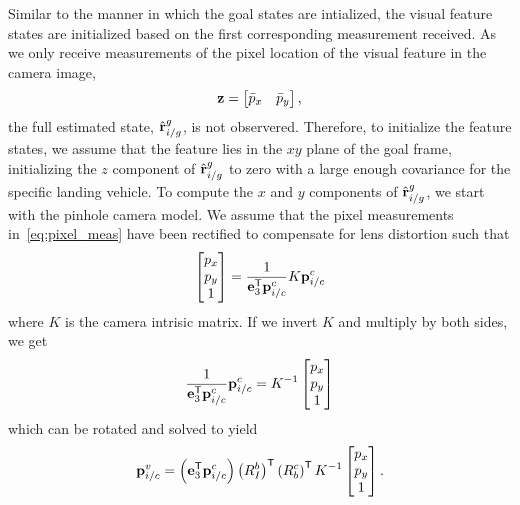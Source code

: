 Similar to the manner in which the goal states are intialized,
the visual feature states are initialized based on the first corresponding measurement received.
As we only receive measurements of the pixel
location of the visual feature in the camera image,
\begin{equation}
  \boldsymbol{\mathrm{z}} = \begin{bmatrix} \bar{p}_x & \bar{p}_y \end{bmatrix}
  \label{eq:pixel_meas},
\end{equation}
the full estimated state, $\hat{\boldsymbol{\mathrm{r}}}_{i/g}^g$, is not observered.
Therefore, to initialize
the feature states, we assume that the feature lies in the $xy$ plane of the
goal frame, initializing the $z$ component of $\hat{\boldsymbol{\mathrm{r}}}_{i/g}^g$ to zero with a
large enough covariance for the specific landing vehicle. To compute the
$x$ and $y$ components of $\hat{\boldsymbol{\mathrm{r}}}_{i/g}^g$, we start with the pinhole camera
model. We assume that the pixel measurements in~\eqref{eq:pixel_meas} have been
rectified to compensate for lens distortion such that
\begin{equation}
  \begin{bmatrix}
    p_x \\ p_y \\ 1
  \end{bmatrix} = \frac{1}{\boldsymbol{\mathrm{e}}_3^{\mathsf{T}} \boldsymbol{\mathrm{p}}_{i/c}^c} K \boldsymbol{\mathrm{p}}_{i/c}^c \\
\end{equation}
where $K$ is the camera intrisic matrix. If we invert $K$ and multiply by both
sides, we get
\begin{equation}
 \frac{1}{\boldsymbol{\mathrm{e}}_3^{\mathsf{T}} \boldsymbol{\mathrm{p}}_{i/c}^c} \boldsymbol{\mathrm{p}}_{i/c}^c
  =
  K^{-1} \begin{bmatrix}
    p_x \\ p_y \\ 1
  \end{bmatrix}
\end{equation}
which can be rotated and solved to yield
\begin{equation}
 \boldsymbol{\mathrm{p}}_{i/c}^v
  =
  \left( \boldsymbol{\mathrm{e}}_3^{\mathsf{T}} \boldsymbol{\mathrm{p}}_{i/c}^c \right) \left( R_I^b
  \right)^{\mathsf{T}} \left( R_b^c \right)^{\mathsf{T}} K^{-1} \begin{bmatrix}
    p_x \\ p_y \\ 1
  \end{bmatrix}.
\end{equation}
